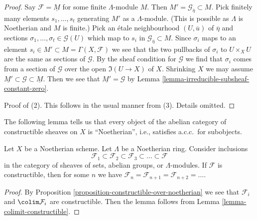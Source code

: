 \begin{proof}
\medskip\noindent
Say $\mathcal{F} = \underline{M}$ for some finite $\Lambda$-module $M$.
Then $M' = \mathcal{G}_{\overline{\eta}} \subset M$. Pick finitely
many elements $s_1, \ldots, s_t$ generating $M'$ as a $\Lambda$-module.
(This is possible as $\Lambda$ is Noetherian and $M$ is finite.)
Pick an \'etale neighbourhood $(U, \overline{u})$ of $\overline{\eta}$
and sections $\sigma_1, \ldots, \sigma_t \in \mathcal{G}(U)$ which map to
$s_i$ in $\mathcal{G}_{\overline{\eta}} \subset M$.
Since $\sigma_i$ maps to an element
$s_i \in M' \subset M = \Gamma(X, \mathcal{F})$
we see that the two pullbacks of $\sigma_i$ to $U \times_X U$
are the same as sections of $\mathcal{G}$. By the sheaf condition
for $\mathcal{G}$ we find that $\sigma_i$ comes from a section
of $\mathcal{G}$ over the open $\Im(U \to X)$ of $X$.
Shrinking $X$ we may assume
$\underline{M'} \subset \mathcal{G} \subset \underline{M}$.
Then we see that $\underline{M'} = \mathcal{G}$ by
Lemma \ref{lemma-irreducible-subsheaf-constant-zero}.

\medskip\noindent
Proof of (2). This follows in the usual manner from (3). Details
omitted.
\end{proof}

\noindent
The following lemma tells us that every object of the abelian category of
constructible sheaves on $X$ is ``Noetherian'', i.e., satisfies
a.c.c.\ for subobjects.

\begin{lemma}
\label{lemma-constructible-over-noetherian-noetherian}
Let $X$ be a Noetherian scheme. Let $\Lambda$ be a Noetherian ring.
Consider inclusions
$$
\mathcal{F}_1 \subset \mathcal{F}_2 \subset \mathcal{F}_3 \subset \ldots
\subset \mathcal{F}
$$
in the category of sheaves of sets, abelian groups, or $\Lambda$-modules.
If $\mathcal{F}$ is constructible, then for some $n$
we have $\mathcal{F}_n = \mathcal{F}_{n + 1} = \mathcal{F}_{n + 2} = \ldots$.
\end{lemma}

\begin{proof}
By Proposition \ref{proposition-constructible-over-noetherian}
we see that $\mathcal{F}_i$ and $\colim \mathcal{F}_i$ are constructible.
Then the lemma follows from
Lemma \ref{lemma-colimit-constructible}.
\end{proof}


